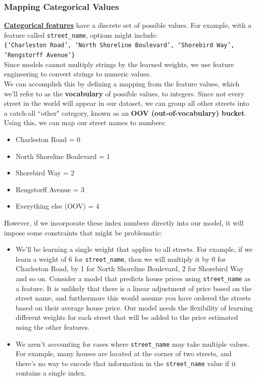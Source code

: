 \documentclass[12pt]{article}
\begin{document}
\subsubsection{Mapping Categorical Values} 
\href{https://developers.google.com/machine-learning/glossary#categorical_data}{\textbf{Categorical features}} have a discrete set of possible values. For example, with a feature called {\tt{street\_name}}, options might include:\\
{\tt{\{`Charleston Road', `North Shoreline Boulevard', `Shorebird Way', `Rengstorff Avenue'}\}}
\\Since models cannot multiply strings by the learned weights, we use feature engineering to convert strings to numeric values.
\\We can accomplish this by defining a mapping from the feature values, which we'll refer to as the \textbf{vocabulary} of possible values, to integers. Since not every street in the world will appear in our dataset, we can group all other streets into a catch-all ``other" category, known as an \textbf{OOV (out-of-vocabulary) bucket}.
\\Using this, we can map our street names to numbers:
\begin{itemize}
	\item Charleston Road = 0
	\item North Shoreline Boulevard = 1
	\item Shorebird Way = 2
	\item Rengstorff Avenue = 3
	\item Everything else (OOV) = 4
\end{itemize}
However, if we incorporate these index numbers directly into our model, it will impose some constraints that might be problematic:
\begin{itemize}
	\item We'll be learning a single weight that applies to all streets. For example, if we learn a weight of 6 for {\tt{street\_name}}, then we will multiply it by 0 for Charleston Road, by 1 for North Shoreline Boulevard, 2 for Shorebird Way and so on. Consider a model that predicts house prices using {\tt{street\_name}} as a feature. It is unlikely that there is a linear adjustment of price based on the street name, and furthermore this would assume you have ordered the streets based on their average house price. Our model needs the flexibility of learning different weights for each street that will be added to the price estimated using the other features.
	\item We aren't accounting for cases where {\tt{street\_name}} may take multiple values. For example, many houses are located at the corner of two streets, and there's no way to encode that information in the {\tt{street\_name}} value if it contains a single index.
\end{itemize}
\end{document}
